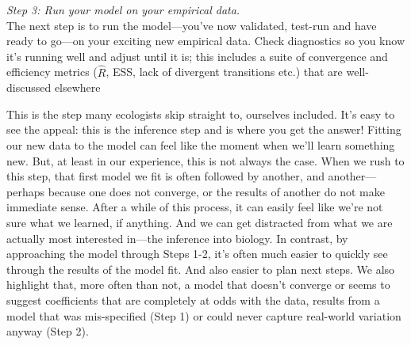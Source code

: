 \documentclass[11pt]{article}
\begin{document}
{%
 \emph{Step 3: Run your model on your empirical data.} \\
The next step is to run the model---you've now validated, test-run and have ready to go---on your exciting new empirical data. Check diagnostics so you know it's running well and adjust until it is; this includes a suite of convergence and efficiency metrics ($\hat{R}$, ESS, lack of divergent transitions etc.) that are well-discussed elsewhere \citep[and not our focus here, see instead][]{betanworkflow,gelman2020bayesian,vandeschoot2021,gabryvis}
 
This is the step many ecologists skip straight to, ourselves included. It's easy to see the appeal: this is the inference step and is where you get the answer! Fitting our new data to the model can feel like the moment when we'll learn something new. But, at least in our experience, this is not always the case. When we rush to this step, that first model we fit is often followed by another, and another---perhaps because one does not converge, or the results of another do not make immediate sense. After a while of this process, it can easily feel like we're not sure what we learned, if anything. And we can get distracted from what we are actually most interested in---the inference into biology. In contrast, by approaching the model through Steps 1-2, it's often much easier to quickly see through the results of the model fit. And also easier to plan next steps. We also highlight that, more often than not, a model that doesn't converge or seems to suggest coefficients that are completely at odds with the data, results from a model that was mis-specified (Step 1) or could never capture real-world variation anyway (Step 2).
 

}
\end{document}
